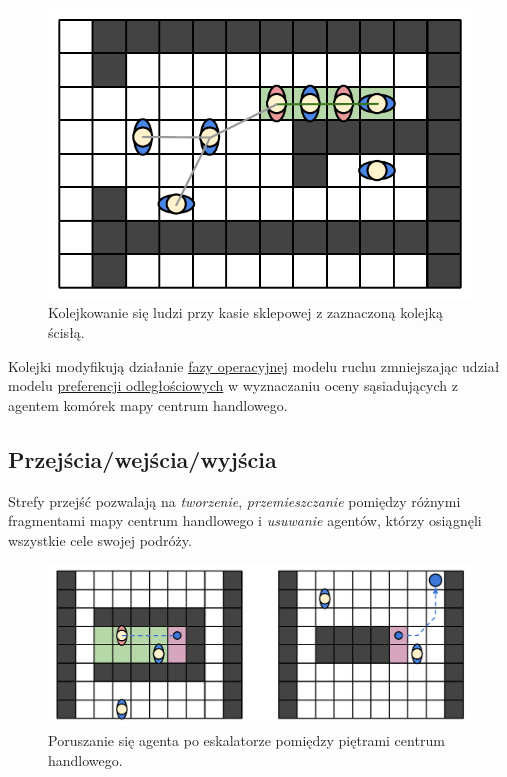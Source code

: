 \documentclass[a4paper, 12pt]{article}
\begin{document}
    \begin{figure}[H]
        \centering
        \includegraphics[scale=0.4]{./img/Queueing.pdf}
        \caption{Kolejkowanie się ludzi przy kasie sklepowej z zaznaczoną kolejką ścisłą.}
        \label{fig:queueing}
    \end{figure}

Kolejki modyfikują działanie \hyperref[sec:operational]{fazy operacyjnej} modelu ruchu zmniejszając udział modelu \hyperref[sec:social-dist]{preferencji odległościowych} w wyznaczaniu oceny sąsiadujących z agentem komórek mapy centrum handlowego.

    \subsection{Przejścia/wejścia/wyjścia}
    \label{sec:entrance-exits}

Strefy przejść pozwalają na \emph{tworzenie}, \emph{przemieszczanie} pomiędzy różnymi fragmentami mapy centrum handlowego i \emph{usuwanie} agentów, którzy osiągnęli wszystkie cele swojej podróży.

    \begin{figure}[H]
        \centering
        \includegraphics[scale=0.4]{./img/EntranceExits.pdf}
        \caption{Poruszanie się agenta po eskalatorze pomiędzy piętrami centrum handlowego.}
        \label{fig:passing-through}
    \end{figure}
\end{document}
